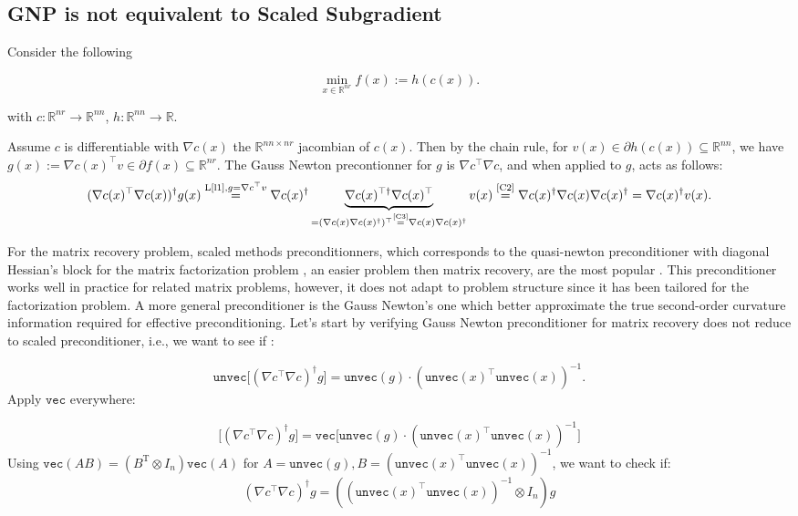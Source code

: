 \documentclass{article}
\begin{document}
\subsection{GNP is not equivalent to Scaled Subgradient}



Consider the following

$$
\min_{x\in \mathbb{R}^{nr} } f(x):= h(c(x)).

$$

with $c: \mathbb{R}^{nr} \to \mathbb{R}^{nn}$, $h:\mathbb{R}^{nn} \to \mathbb{R}$.


Assume $c$ is differentiable with $\nabla c(x)$ the $\mathbb{R}^{nn \times nr}$ jacombian of $c(x)$. Then by the chain rule, for $v(x) \in \partial h ( c(x)) \subseteq \mathbb{R}^{nn}$,  we have $g(x):= \nabla c(x)^{\top} v  \in \partial f(x) \subseteq \mathbb{R}^{nr}$. The Gauss Newton precontionner \cite{davis2022linearly} for $g$ is  $\nabla c ^\top \nabla c$, and when applied to $g$, acts as follows:
\[
(\nabla c(x)^\top \nabla c(x))^{\dagger} g(x) \overset{\text{L\ref{l1},}g=\nabla c^\top v}{=} \nabla c(x)^\dagger \underbrace{\nabla c(x)^{\top \dagger } \nabla c(x)^\top}_{ = (\nabla c(x) \nabla c(x)^\dagger)^\top \overset{\text{\ref{C3}}}{=} \nabla c(x) \nabla c(x)^\dagger  } v(x)  \overset{\text{\ref{C2}}}{=} \nabla c(x)^\dagger \nabla c(x) \nabla c(x)^\dagger = \nabla c(x)^\dagger v(x).
\]


For the matrix recovery problem,  scaled methods preconditionners, which corresponds to the quasi-newton preconditioner with diagonal Hessian's block for the matrix factorization problem \cite{Tong_smooth}, an easier problem then matrix recovery, are the most popular \cite{Tong_smooth,Tong_nonsmooth}. This preconditioner works well in practice for related matrix problems, however, it does not adapt to problem structure since it has been tailored for the factorization problem. A more general preconditioner is the Gauss Newton's one which better approximate the true second-order curvature information required for effective preconditioning. Let's start by verifying Gauss Newton preconditioner for matrix recovery does not reduce to scaled preconditioner, i.e., we want to see if :


$$
\texttt{unvec}\big[(\nabla c^\top \nabla c)^\dagger g  \big]  = \texttt{unvec}(g) \cdot (\texttt{unvec}(x)^\top \texttt{unvec}(x))^{-1}.
$$
Apply $\texttt{vec}$ everywhere:

$$
\big[(\nabla c^\top \nabla c)^\dagger g  \big]  = \texttt{vec} \big[ \texttt{unvec}(g) \cdot (\texttt{unvec}(x)^\top \texttt{unvec}(x))^{-1} \big ]
$$
Using $\texttt{vec}(AB) = (B^{\mathrm{T}} \otimes I_{n})\texttt{vec}(A)$ for $A=\texttt{unvec}(g), B=(\texttt{unvec}(x)^\top \texttt{unvec}(x))^{-1}$, we want to check if:
$$
(\nabla c^\top \nabla c)^\dagger  g = ((\texttt{unvec}(x)^\top \texttt{unvec}(x))^{-1}\otimes I_{n}) g
$$
\end{document}

